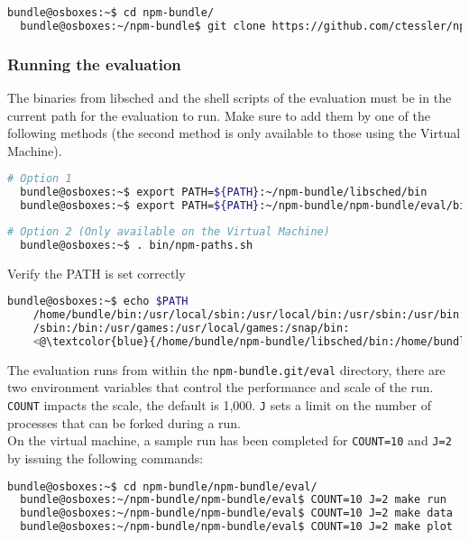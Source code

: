 \documentclass[a4paper]{article}
\begin{document}
\begin{lstlisting}[language=bash]
  bundle@osboxes:~$ cd npm-bundle/
  bundle@osboxes:~/npm-bundle$ git clone https://github.com/ctessler/npm-bundle.git
\end{lstlisting}

\subsubsection{Running the evaluation}\label{sec:running}

The binaries from libsched and the shell scripts of the evaluation
must be in the current path for the evaluation to run. Make sure to
add them by one of the following methods (the second method is only
available to those using the Virtual Machine).

\begin{lstlisting}[language=bash]
  # Option 1
  bundle@osboxes:~$ export PATH=${PATH}:~/npm-bundle/libsched/bin
  bundle@osboxes:~$ export PATH=${PATH}:~/npm-bundle/npm-bundle/eval/bin
\end{lstlisting}

\begin{lstlisting}[language=bash]
  # Option 2 (Only available on the Virtual Machine)
  bundle@osboxes:~$ . bin/npm-paths.sh
\end{lstlisting}

{\noindent}Verify the PATH is set correctly
\begin{lstlisting}[language=bash]
  bundle@osboxes:~$ echo $PATH
    /home/bundle/bin:/usr/local/sbin:/usr/local/bin:/usr/sbin:/usr/bin:
    /sbin:/bin:/usr/games:/usr/local/games:/snap/bin:
    <@\textcolor{blue}{/home/bundle/npm-bundle/libsched/bin:/home/bundle/npm-bundle/npm-bundle/eval/bin}@>
\end{lstlisting}


{\noindent}The evaluation runs from within the \texttt{npm-bundle.git/eval}
directory, there are two environment variables that control the
performance and scale of the run. \texttt{COUNT} impacts the scale,
the default is 1,000. \texttt{J} sets a limit on the number of
processes that can be forked during a run.\\


{\noindent}On the virtual machine, a sample run has been completed for
\texttt{COUNT=10} and \texttt{J=2} by issuing the following commands:

\begin{lstlisting}[language=bash]
  bundle@osboxes:~$ cd npm-bundle/npm-bundle/eval/
  bundle@osboxes:~/npm-bundle/npm-bundle/eval$ COUNT=10 J=2 make run
  bundle@osboxes:~/npm-bundle/npm-bundle/eval$ COUNT=10 J=2 make data
  bundle@osboxes:~/npm-bundle/npm-bundle/eval$ COUNT=10 J=2 make plot
\end{lstlisting}
\end{document}
